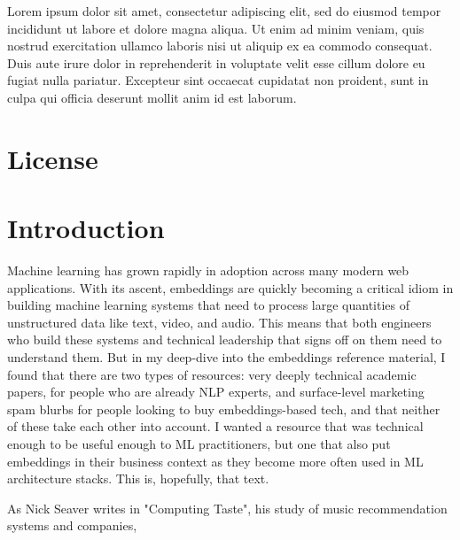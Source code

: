 \documentclass[draft, 11pt]{diazessay} %
\begin{document}
Lorem ipsum dolor sit amet, consectetur adipiscing elit, sed do eiusmod tempor incididunt ut labore et dolore magna aliqua. Ut enim ad minim veniam, quis nostrud exercitation ullamco laboris nisi ut aliquip ex ea commodo consequat. Duis aute irure dolor in reprehenderit in voluptate velit esse cillum dolore eu fugiat nulla pariatur. Excepteur sint occaecat cupidatat non proident, sunt in culpa qui officia deserunt mollit anim id est laborum.


\section*{License}
\doclicenseThis
\newpage

\tableofcontents
\newpage


\section{Introduction}

Machine learning has grown rapidly in adoption across many modern web applications. With its ascent, embeddings are quickly becoming a critical idiom in building machine learning systems that need to process large quantities of unstructured data like text, video, and audio. This means that both engineers who build these systems and technical leadership that signs off on them need to understand them.  But in my deep-dive into the embeddings reference material, I found that there are two types of resources: very deeply technical academic papers, for people who are already NLP experts, and surface-level marketing spam blurbs for people looking to buy embeddings-based tech, and that neither of these take each other into account.  I wanted a resource that was technical enough to be useful enough to ML practitioners, but one that also put embeddings in their business context as they become more often used in ML architecture stacks. This is, hopefully, that text. 

As Nick Seaver \citep{seaver2022computing} writes in "Computing Taste", his study of music recommendation systems and companies,
\end{document}
